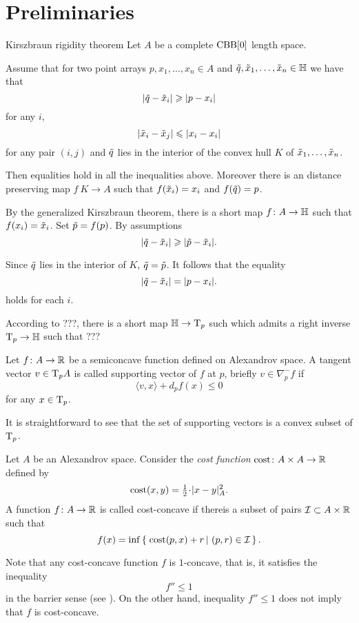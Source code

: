 \section{Preliminaries}

\begin{thm}{Kirszbraun rigidity theorem}\label{thm:kirszbraun-rigid}
Let $A$ be a complete $\CBB[0]$ length space.

Assume that for two point arrays $p,x_1,\dots,x_n\in A$ and $\~q, \~x_1,\dots,\~x_n\in \HH$ we have that 
\[|\~q-\~x_i|\ge |p-x_i|\]
for any $i$,
\[|\~x_i-\~x_j|\le |x_i-x_i|\]
for any pair $(i,j)$
and $\~q$ lies in the interior of the convex hull $K$ of $\~x_1,\dots,\~x_n$.

Then equalities hold in all the inequalities above.
Moreover there is an distance preserving map $f\:K\to A$ such that $f(\~x_i)=x_i$ and $f(\~q)=p$. 
\end{thm}

By the generalized Kirszbraun theorem, there is a short map $f\:A\to \HH$
such that $f(x_i)=\~x_i$.
Set  $\~p=f(p)$.
By assumptions
\[|\~q-\~x_i|\ge |\~p-\~x_i|.\]

Since $\~q$ lies in the interior of $K$, $\~q=\~p$.
It follows that the equality 
\[|\~q-\~x_i|= |p-x_i|.\]
holds for each $i$.

According to ???, there is a short map $\HH\to \T_p$ such which admits a right inverse $\T_p\to \HH$ such that ???
\qeds

Let $f\: A\to \RR$ be a semiconcave function defined on Alexandrov space.
A tangent vector $v\in \T_pA$ is called supporting vector of $f$ at $p$, briefly $v\in\nabla^-_pf$ if
\[\langle v,x\rangle+d_pf(x)\le 0\]
for any $x\in \T_p$.

It is straightforward to see that the set of supporting vectors is a convex subset of $\T_p$.

Let $A$ be an Alexandrov space.
Consider the \emph{cost function} $\cost\:A\times A\to \RR$ defined by \[\cost(x,y)=\tfrac12\cdot|x-y|_A^2.\]
A function $f\:A\to \RR$ is called cost-concave if thereis a subset of pairs $\mathcal{I}\subset A\times \RR$ such that
\[f(x)=\inf\set{\cost(p,x)+r}{(p,r)\in\mathcal{I}}.\]

Note that any cost-concave function $f$ is $1$-concave, that is, it satisfies the inequality 
\[f''\le 1\]
in the barrier sense (see \cite{AKP-book}).
On the other hand, inequality $f''\le 1$ does not imply that $f$ is cost-concave.


